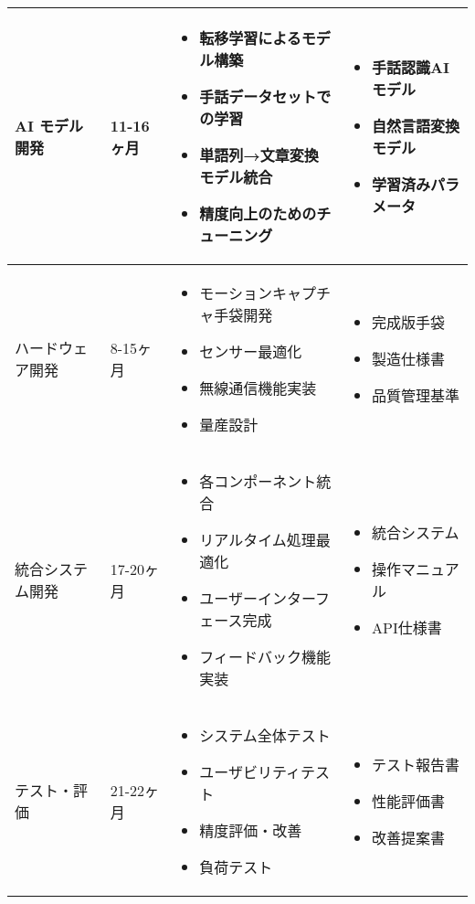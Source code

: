 \documentclass[12pt,a4paper]{jsarticle}
\begin{document}
\begin{longtable}{|p{3cm}|p{2.5cm}|p{6cm}|p{3cm}|}
AI モデル開発 & 11-16ヶ月 & 
\begin{itemize}
\item 転移学習によるモデル構築
\item 手話データセットでの学習
\item 単語列→文章変換モデル統合
\item 精度向上のためのチューニング
\end{itemize} & 
\begin{itemize}
\item 手話認識AIモデル
\item 自然言語変換モデル
\item 学習済みパラメータ
\end{itemize} \\
\hline

ハードウェア開発 & 8-15ヶ月 & 
\begin{itemize}
\item モーションキャプチャ手袋開発
\item センサー最適化
\item 無線通信機能実装
\item 量産設計
\end{itemize} & 
\begin{itemize}
\item 完成版手袋
\item 製造仕様書
\item 品質管理基準
\end{itemize} \\
\hline

統合システム開発 & 17-20ヶ月 & 
\begin{itemize}
\item 各コンポーネント統合
\item リアルタイム処理最適化
\item ユーザーインターフェース完成
\item フィードバック機能実装
\end{itemize} & 
\begin{itemize}
\item 統合システム
\item 操作マニュアル
\item API仕様書
\end{itemize} \\
\hline

テスト・評価 & 21-22ヶ月 & 
\begin{itemize}
\item システム全体テスト
\item ユーザビリティテスト
\item 精度評価・改善
\item 負荷テスト
\end{itemize} & 
\begin{itemize}
\item テスト報告書
\item 性能評価書
\item 改善提案書
\end{itemize} \\
\hline


\end{longtable}
\end{document}
